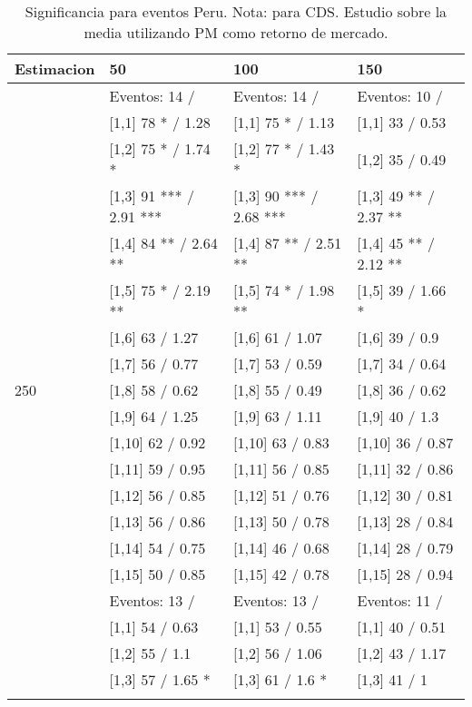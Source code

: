 \begin{table}

\caption{Significancia para eventos Peru. Nota: para CDS. Estudio sobre la media utilizando PM como retorno de mercado.}
\centering
\begin{tabular}[t]{llll}
\toprule
Estimacion & 50 & 100 & 150\\
\midrule
 & Eventos:  14 / & Eventos:  14 / & Eventos:  10 /\\
 & {}[1,1] 78 * / 1.28 & {}[1,1] 75 * / 1.13 & {}[1,1] 33  / 0.53\\
 & {}[1,2] 75 * / 1.74 * & {}[1,2] 77 * / 1.43 * & {}[1,2] 35  / 0.49\\
 & {}[1,3] 91 *** / 2.91 *** & {}[1,3] 90 *** / 2.68 *** & {}[1,3] 49 ** / 2.37 **\\
 & {}[1,4] 84 ** / 2.64 ** & {}[1,4] 87 ** / 2.51 ** & {}[1,4] 45 ** / 2.12 **\\
\addlinespace
 & {}[1,5] 75 * / 2.19 ** & {}[1,5] 74 * / 1.98 ** & {}[1,5] 39  / 1.66 *\\
 & {}[1,6] 63  / 1.27 & {}[1,6] 61  / 1.07 & {}[1,6] 39  / 0.9\\
 & {}[1,7] 56  / 0.77 & {}[1,7] 53  / 0.59 & {}[1,7] 34  / 0.64\\
250 & {}[1,8] 58  / 0.62 & {}[1,8] 55  / 0.49 & {}[1,8] 36  / 0.62\\
 & {}[1,9] 64  / 1.25 & {}[1,9] 63  / 1.11 & {}[1,9] 40  / 1.3\\
\addlinespace
 & {}[1,10] 62  / 0.92 & {}[1,10] 63  / 0.83 & {}[1,10] 36  / 0.87\\
 & {}[1,11] 59  / 0.95 & {}[1,11] 56  / 0.85 & {}[1,11] 32  / 0.86\\
 & {}[1,12] 56  / 0.85 & {}[1,12] 51  / 0.76 & {}[1,12] 30  / 0.81\\
 & {}[1,13] 56  / 0.86 & {}[1,13] 50  / 0.78 & {}[1,13] 28  / 0.84\\
 & {}[1,14] 54  / 0.75 & {}[1,14] 46  / 0.68 & {}[1,14] 28  / 0.79\\
\addlinespace
 & {}[1,15] 50  / 0.85 & {}[1,15] 42  / 0.78 & {}[1,15] 28  / 0.94\\
 & Eventos:  13 / & Eventos:  13 / & Eventos:  11 /\\
 & {}[1,1] 54  / 0.63 & {}[1,1] 53  / 0.55 & {}[1,1] 40  / 0.51\\
 & {}[1,2] 55  / 1.1 & {}[1,2] 56  / 1.06 & {}[1,2] 43  / 1.17\\
 & {}[1,3] 57  / 1.65 * & {}[1,3] 61  / 1.6 * & {}[1,3] 41  / 1\\
\addlinespace

\end{tabular}
\end{table}
